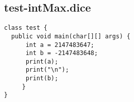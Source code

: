 \subsection{test-intMax.dice}
\begin{verbatim}
class test {
  public void main(char[][] args) {
      int a = 2147483647;
      int b = -2147483648;
      print(a);
      print("\n");
      print(b);
     }
}
\end{verbatim}